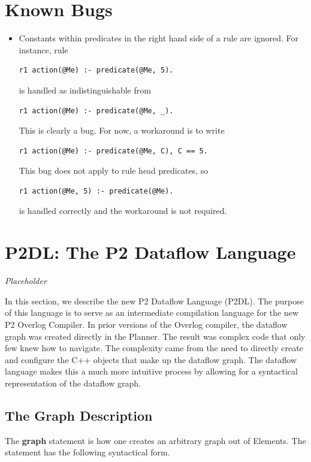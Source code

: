 \documentclass{article}
\begin{document}
\section{Known Bugs}

\begin{itemize}
\item Constants within predicates in the right hand side of a rule are
  ignored. For instance, rule 
\begin{lstlisting}
r1 action(@Me) :- predicate(@Me, 5).
\end{lstlisting}
is handled as indistinguishable from
\begin{lstlisting}
r1 action(@Me) :- predicate(@Me, _).
\end{lstlisting}
This is clearly a bug. For now, a workaround is to write
\begin{lstlisting}
r1 action(@Me) :- predicate(@Me, C), C == 5.
\end{lstlisting}
This bug does not apply to rule head predicates, so 
\begin{lstlisting}
r1 action(@Me, 5) :- predicate(@Me).
\end{lstlisting}
is handled correctly and the workaround is not required.
\end{itemize}



\section{P2DL: The P2 Dataflow Language}
\label{sec:p2dl}

\emph{Placeholder}

In this section, we describe the new P2 Dataflow Language (P2DL). The purpose
of this language is to serve as an intermediate compilation language for the
new P2 Overlog Compiler. In prior versions of the Overlog compiler, the dataflow
graph was created directly in the Planner. The result was complex code that only
few knew how to navigate. The complexity came from the need to directly create
and configure the C++ objects that make up the dataflow graph. The dataflow
language makes this a much more intuitive process by allowing for a syntactical 
representation of the dataflow graph.


\subsection{The Graph Description}

The {\bf graph} statement is how one creates an arbitrary graph out of
Elements. The statement has the following syntactical form.
\end{document}
